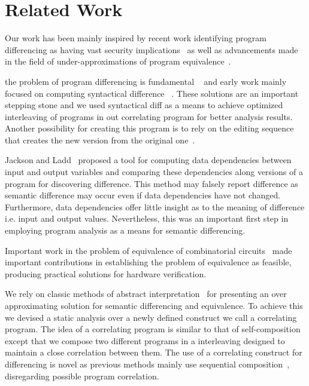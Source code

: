 \section{Related Work} 

Our work has been mainly inspired by recent work identifying program differencing as having vast security implications~\cite{BrumleyPoosankamSongZheng08,SongSunZhang09} as well as advancements made in the field of under-approximations of program equivalence~\cite{GodlinStrichman09, KawaguchiLahiriRebelo10, DwyerElbaumPerson08, EnglerRamos11}.

the problem of program differencing is fundamental ~\cite{Hoare69} and early work mainly focused on computing syntactical difference ~\cite{HuntMcIlroy75}. These solutions are an important stepping stone and we used syntactical diff as a means to achieve optimized interleaving of programs in out correlating program for better analysis results. Another possibility for creating this program is to rely on the editing sequence that creates the new version from the original one~\cite{Horwitz:PLDI90}. 

Jackson and Ladd~\cite{JacksonLadd94} proposed a tool for computing data dependencies between input and output variables and comparing these dependencies along versions of a program for discovering difference. This method may falsely report difference as semantic difference may occur even if data dependencies have not changed. Furthermore, data dependencies offer little insight as to the meaning of difference i.e. input and output values. Nevertheless, this was an important first step in employing program analysis as a means for semantic differencing.

Important work in the problem of equivalence of combinatorial circuits~\cite{KuehlmannKrohm97,BraytonChatterjeeMishchenkoEen06, ClarkeKroening03} made important contributions in establishing the problem of equivalence as feasible, producing practical solutions for hardware verification.

We rely on classic methods of abstract interpretation~\cite{CousotCousot77} for presenting an over approximating solution for semantic differencing and equivalence. To achieve this we devised a static analysis over a newly defined construct we call a correlating program. The idea of a correlating program is similar to that of
self-composition~\cite{BartheDArgenioRezk04, AikenTerauchi05} except that we compose two different programs in a interleaving designed to maintain a close correlation between them. The use of a correlating construct for differencing is novel as previous methods mainly use sequential composition~\cite{GodlinStrichman09, DwyerElbaumPerson08, EnglerRamos11}, disregarding possible program correlation.

